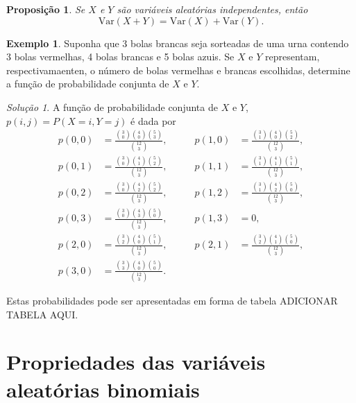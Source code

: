 \documentclass[]{book}
\newtheorem{proposition}{Proposição}[chapter]
\theoremstyle{definition}
\theoremstyle{definition}
\newtheorem{example}{Exemplo}[chapter]
\theoremstyle{definition}
\theoremstyle{remark}
\newtheorem*{solution}{Solução}
\begin{document}
\begin{proposition}
\protect\hypertarget{prp:propSomaVar}{}{\label{prp:propSomaVar} }Se \(X\) e \(Y\) são variáveis aleatórias independentes, então
\[\mathrm{Var}(X+Y)=\mathrm{Var}(X)+\mathrm{Var}(Y).\]
\end{proposition}

\begin{example}
\protect\hypertarget{exm:unnamed-chunk-156}{}{\label{exm:unnamed-chunk-156} }Suponha que 3 bolas brancas seja sorteadas de uma urna contendo 3 bolas vermelhas, 4 bolas brancas e 5 bolas azuis.
Se \(X\) e \(Y\) representam, respectivamaenten, o número de bolas vermelhas e brancas escolhidas, determine a função de probabilidade conjunta de \(X\) e \(Y\).
\end{example}
\begin{solution}
\iffalse{} {Solução. } \fi{}A função de probabilidade conjunta de \(X\) e \(Y\), \(p(i,j)=P(X=i,Y=j)\) é dada por
\begin{align}
p(0,0) &= \frac{{3\choose 0}{4\choose 0}{5\choose 3}}{{12 \choose 3}}, 
  &\qquad p(1,0) &= \frac{{3\choose 1}{4\choose 0}{5\choose 2}}{{12 \choose 3}},\\
p(0,1) &= \frac{{3\choose 0}{4\choose 1}{5\choose 2}}{{12 \choose 3}}, 
  &\qquad p(1,1) &= \frac{{3\choose 1}{4\choose 1}{5\choose 1}}{{12 \choose 3}},\\
p(0,2) &= \frac{{3\choose 0}{4\choose 2}{5\choose 2}}{{12 \choose 3}}, 
  &\qquad p(1,2) &= \frac{{3\choose 1}{4\choose 2}{5\choose 0}}{{12 \choose 3}},\\
p(0,3) &= \frac{{3\choose 0}{4\choose 3}{5\choose 0}}{{12 \choose 3}},
  &\qquad p(1,3) &= 0,\\
p(2,0) &= \frac{{3\choose 2}{4\choose 0}{5\choose 1}}{{12 \choose 3}}, 
  &\qquad p(2,1) &= \frac{{3\choose 2}{4\choose 1}{5\choose 0}}{{12 \choose 3}},\\
p(3,0) &= \frac{{3\choose 3}{4\choose 0}{5\choose 0}}{{12 \choose 3}}. 
\end{align}

Estas probabilidades pode ser apresentadas em forma de tabela ADICIONAR TABELA AQUI.
\end{solution}

\hypertarget{propriedades-das-variuxe1veis-aleatuxf3rias-binomiais}{%
\section{Propriedades das variáveis aleatórias binomiais}\label{propriedades-das-variuxe1veis-aleatuxf3rias-binomiais}}
\end{document}
